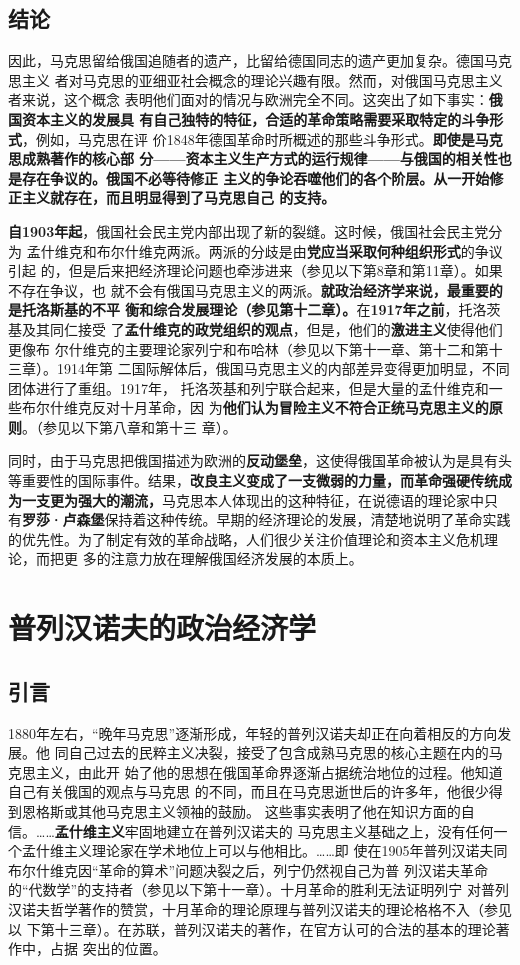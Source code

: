 \section{结论}
因此，马克思留给俄国追随者的遗产，比留给德国同志的遗产更加复杂。德国马克思主义
者对马克思的亚细亚社会概念的理论兴趣有限。然而，对俄国马克思主义者来说，这个概念
表明他们面对的情况与欧洲完全不同。这突出了如下事实：\textbf{俄国资本主义的发展具
  有自己独特的特征，合适的革命策略需要采取特定的斗争形式}，例如，马克思在评
价1848年德国革命时所概述的那些斗争形式。\textbf{即使是马克思成熟著作的核心部
  分——资本主义生产方式的运行规律——与俄国的相关性也是存在争议的。俄国不必等待修正
  主义的争论吞噬他们的各个阶层。从一开始修正主义就存在，而且明显得到了马克思自己
  的支持。}

\textbf{自1903年起}，俄国社会民主党内部出现了新的裂缝。这时候，俄国社会民主党分为
孟什维克和布尔什维克两派。两派的分歧是由\textbf{党应当采取何种组织形式}的争议引起
的，但是后来把经济理论问题也牵涉进来（参见以下第8章和第11章）。如果不存在争议，也
就不会有俄国马克思主义的两派。\textbf{就政治经济学来说，最重要的是托洛斯基的不平
  衡和综合发展理论（参见第十二章）。}在\textbf{1917年之前}，托洛茨基及其同仁接受
了\textbf{孟什维克的政党组织的观点}，但是，他们的\textbf{激进主义}使得他们更像布
尔什维克的主要理论家列宁和布哈林（参见以下第十一章、第十二和第十三章）。1914年第
二国际解体后，俄国马克思主义的内部差异变得更加明显，不同团体进行了重组。1917年，
托洛茨基和列宁联合起来，但是大量的孟什维克和一些布尔什维克反对十月革命，因
为\textbf{他们认为冒险主义不符合正统马克思主义的原则}。（参见以下第八章和第十三
章）。

同时，由于马克思把俄国描述为欧洲的\textbf{反动堡垒}，这使得俄国革命被认为是具有头
等重要性的国际事件。结果，\textbf{改良主义变成了一支微弱的力量，而革命强硬传统成
  为一支更为强大的潮流，}马克思本人体现出的这种特征，在说德语的理论家中只
有\textbf{罗莎·卢森堡}保持着这种传统。早期的经济理论的发展，清楚地说明了革命实践
的优先性。为了制定有效的革命战略，人们很少关注价值理论和资本主义危机理论，而把更
多的注意力放在理解俄国经济发展的本质上。

\chapter{普列汉诺夫的政治经济学}

\section{引言}
1880年左右，“晚年马克思”逐渐形成，年轻的普列汉诺夫却正在向着相反的方向发展。他
同自己过去的民粹主义决裂，接受了包含成熟马克思的核心主题在内的马克思主义，由此开
始了他的思想在俄国革命界逐渐占据统治地位的过程。他知道自己有关俄国的观点与马克思
的不同，而且在马克思逝世后的许多年，他很少得到恩格斯或其他马克思主义领袖的鼓励。
这些事实表明了他在知识方面的自信。……\textbf{孟什维主义}牢固地建立在普列汉诺夫的
马克思主义基础之上，没有任何一个孟什维主义理论家在学术地位上可以与他相比。……即
使在1905年普列汉诺夫同布尔什维克因“革命的算术”问题决裂之后，列宁仍然视自己为普
列汉诺夫革命的“代数学”的支持者（参见以下第十一章）。十月革命的胜利无法证明列宁
对普列汉诺夫哲学著作的赞赏，十月革命的理论原理与普列汉诺夫的理论格格不入（参见以
下第十三章）。在苏联，普列汉诺夫的著作，在官方认可的合法的基本的理论著作中，占据
突出的位置。

